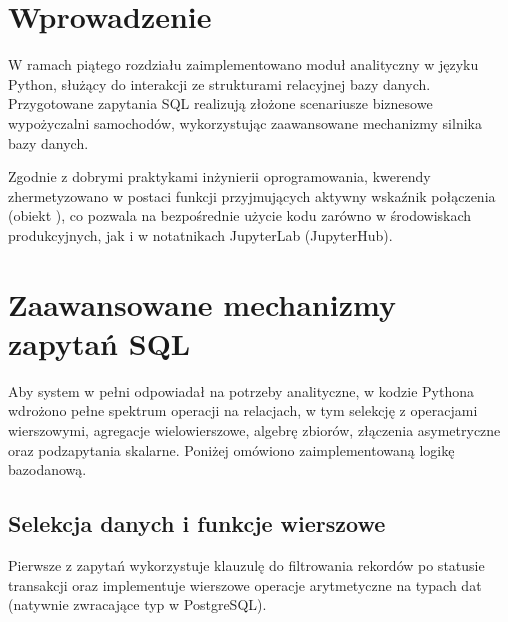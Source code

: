 \documentclass[a4paper,11pt,english,openany,oneside]{sphinxmanual}
\begin{document}
\section{Wprowadzenie}
\label{\detokenize{rozdzial_5/index:wprowadzenie}}
\sphinxAtStartPar
W ramach piątego rozdziału zaimplementowano moduł analityczny w języku Python, służący do interakcji ze strukturami relacyjnej bazy danych. Przygotowane zapytania SQL realizują złożone scenariusze biznesowe wypożyczalni samochodów, wykorzystując zaawansowane mechanizmy silnika bazy danych.

\sphinxAtStartPar
Zgodnie z dobrymi praktykami inżynierii oprogramowania, kwerendy zhermetyzowano w postaci funkcji przyjmujących aktywny wskaźnik połączenia (obiekt ), co pozwala na bezpośrednie użycie kodu zarówno w środowiskach produkcyjnych, jak i w notatnikach JupyterLab (JupyterHub).


\section{Zaawansowane mechanizmy zapytań SQL}
\label{\detokenize{rozdzial_5/index:zaawansowane-mechanizmy-zapytan-sql}}
\sphinxAtStartPar
Aby system w pełni odpowiadał na potrzeby analityczne, w kodzie Pythona wdrożono pełne spektrum operacji na relacjach, w tym selekcję z operacjami wierszowymi, agregacje wielowierszowe, algebrę zbiorów, złączenia asymetryczne oraz podzapytania skalarne. Poniżej omówiono zaimplementowaną logikę bazodanową.


\subsection{Selekcja danych i funkcje wierszowe}
\label{\detokenize{rozdzial_5/index:selekcja-danych-i-funkcje-wierszowe}}
\sphinxAtStartPar
Pierwsze z zapytań wykorzystuje klauzulę  do filtrowania rekordów po statusie transakcji oraz implementuje wierszowe operacje arytmetyczne na typach dat (natywnie zwracające typ  w PostgreSQL).
\end{document}
